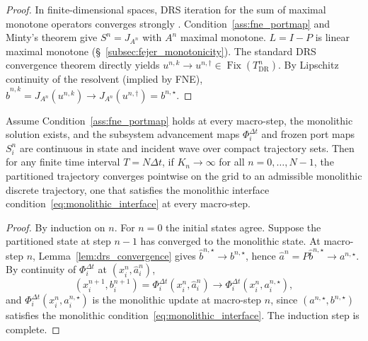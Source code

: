 \begin{proof}
In finite-dimensional spaces, DRS iteration for the sum of maximal monotone operators converges strongly \cite{lions1979splitting,bauschke2017convex}. Condition~\ref{ass:fne_portmap} and Minty's theorem give $S^n = J_{A^n}$ with $A^n$ maximal monotone. $L = I-P$ is linear maximal monotone (\S~\ref{subsec:fejer_monotonicity}). The standard DRS convergence theorem directly yields $u^{n,k} \to u^{n,\dagger} \in \operatorname{Fix}(T_{\text{DR}}^n)$. By Lipschitz continuity of the resolvent (implied by FNE), $\hat{b}^{n,k} = J_{A^n}(u^{n,k}) \to J_{A^n}(u^{n,\dagger}) = b^{n,\star}$.
\end{proof}

\begin{theorem}
\label{thm:kn_to_infty_monolithic}
Assume Condition~\ref{ass:fne_portmap} holds at every macro-step, the monolithic solution exists, and the subsystem advancement maps $\Phi_i^{\Delta t}$ and frozen port maps $S_i^n$ are continuous in state and incident wave over compact trajectory sets. Then for any finite time interval $T = N \Delta t$, if $K_n \to \infty$ for all $n = 0, \dots, N-1$, the partitioned trajectory converges pointwise on the grid to an admissible monolithic discrete trajectory, one that satisfies the monolithic interface condition~\eqref{eq:monolithic_interface} at every macro-step.
\end{theorem}

\begin{proof}
By induction on $n$. For $n=0$ the initial states agree. Suppose the partitioned state at step $n-1$ has converged to the monolithic state. At macro-step $n$, Lemma~\ref{lem:drs_convergence} gives $\hat{b}^{n,\star} \to b^{n,\star}$, hence $\hat{a}^n = P \hat{b}^{n,\star} \to a^{n,\star}$. By continuity of $\Phi_i^{\Delta t}$ at $(x_i^n, \hat{a}_i^n)$,
\begin{equation}
(x_i^{n+1}, b_i^{n+1}) = \Phi_i^{\Delta t}(x_i^n, \hat{a}_i^n) \to \Phi_i^{\Delta t}(x_i^n, a_i^{n,\star}),
\end{equation}
and $\Phi_i^{\Delta t}(x_i^n, a_i^{n,\star})$ is the monolithic update at macro-step $n$, since $(a^{n,\star}, b^{n,\star})$ satisfies the monolithic condition~\eqref{eq:monolithic_interface}. The induction step is complete.
\end{proof}

